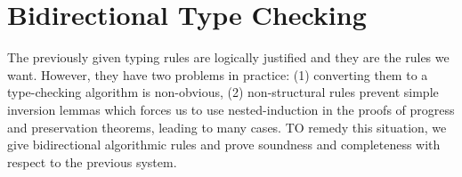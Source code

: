 \documentclass[11pt]{article}
\theoremstyle{plain}
\theoremstyle{definition}
\theoremstyle{remark}
\DeclarePairedDelimiter\parens{(}{)}             %
\DeclarePairedDelimiter\braces{\lbrace}{\rbrace} %
\newcommand\indexVar{x}
\newcommand\lolli{\multimap}
\newcommand\terminate{\mathbf{1}}
\newcommand\tensor{\otimes}
\newcommand\lab{lab}
\newcommand\internal{\oplus}
\newcommand\external{\&}
\newcommand\internals[2]{\internal\braces{\lab_\indexVar : {#1}_\indexVar}_{\indexVar \in #2}}
\newcommand\externals[2]{\external\braces{\lab_\indexVar : {#1}_\indexVar}_{\indexVar \in #2}}
\newcommand\seq{\;;\;}
\newcommand\tbranches[2]{\braces{\lab_\indexVar \rightarrow {#1}_\indexVar}_{\indexVar \in #2}}
\newcommand\tfwd[2]{#1 \leftarrow #2}
\newcommand\tspawn[3]{#1 \leftarrow #2 \seq #3}
\newcommand\tclose[1]{\mathrm{close}\;#1}
\newcommand\twait[2]{\mathrm{wait}\;#1 \seq #2}
\newcommand\tsend[4]{\mathrm{send}\; #1 \; \parens{#2 \leftarrow #3} \seq #4}
\newcommand\trecv[3]{#1 \leftarrow \mathrm{recv} \; #2 \seq #3}
\newcommand\tcase[2]{\mathrm{case}\;#1\;\mathrm{of}\;#2}
\newcommand\tselect[3]{#1 . \lab_{#2} \seq #3}
\newcommand\irb[1]{\texttt{#1}}
\newcommand\Right{\irb{R}}
\newcommand\Left{\irb{L}}
\newcommand\id{\irb{id}}
\newcommand\cut{\irb{cut}}
\newcommand{\emptyCtx}{\emptyset}
\newcommand{\ctx}{\Psi}
\newcommand\typeProc[3]{#1 :: \parens{#2 : #3}}
\newcommand\typeS[4]{#1 \vdash \typeProc{#2}{#3}{#4}}
\newcommand\typeSJ{\typeS{\ctx}}
\newcommand\syn[4]{#1 \Vdash #2 :: #3 \Rightarrow #4}
\begin{document}
\section{Bidirectional Type Checking}

The previously given typing rules are logically justified and they are the rules we want. However, they have two problems in practice: (1) converting them to a type-checking algorithm is non-obvious, (2) non-structural rules prevent simple inversion lemmas which forces us to use nested-induction in the proofs of progress and preservation theorems, leading to many cases. TO remedy this situation, we give bidirectional algorithmic rules and prove soundness and completeness with respect to the previous system.

\end{document}
